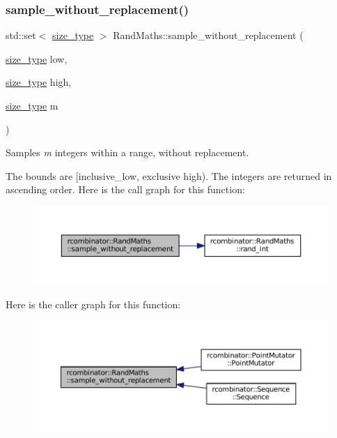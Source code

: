 \subsubsection{\texorpdfstring{sample\+\_\+without\+\_\+replacement()}{sample\_without\_replacement()}}
{\footnotesize\ttfamily std\+::set$<$ \mbox{\hyperlink{constants_8h_abcd18a5521fc90ff6e7b00e4fee98397}{size\+\_\+type}} $>$ Rand\+Maths\+::sample\+\_\+without\+\_\+replacement (\begin{DoxyParamCaption}\item[{\mbox{\hyperlink{constants_8h_abcd18a5521fc90ff6e7b00e4fee98397}{size\+\_\+type}}}]{low,  }\item[{\mbox{\hyperlink{constants_8h_abcd18a5521fc90ff6e7b00e4fee98397}{size\+\_\+type}}}]{high,  }\item[{\mbox{\hyperlink{constants_8h_abcd18a5521fc90ff6e7b00e4fee98397}{size\+\_\+type}}}]{m }\end{DoxyParamCaption})}



Samples {\itshape m} integers within a range, without replacement. 

The bounds are \mbox{[}inclusive\+\_\+low, exclusive high). The integers are returned in ascending order. Here is the call graph for this function\+:
\nopagebreak
\begin{figure}[H]
\begin{center}
\leavevmode
\includegraphics[width=350pt]{classrcombinator_1_1RandMaths_a6a7fe159f46afec51d997e4d07d2cfe6_cgraph}
\end{center}
\end{figure}
Here is the caller graph for this function\+:
\nopagebreak
\begin{figure}[H]
\begin{center}
\leavevmode
\includegraphics[width=350pt]{classrcombinator_1_1RandMaths_a6a7fe159f46afec51d997e4d07d2cfe6_icgraph}
\end{center}
\end{figure}
\mbox{\label{classrcombinator_1_1RandMaths_a2b61e31de6067ffa35531d5bde40f4c6}} 
